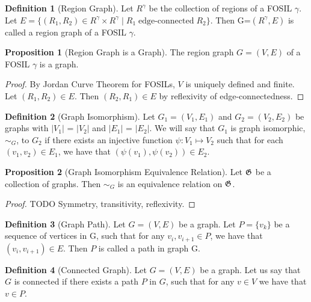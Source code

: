 \documentclass{article}
\theoremstyle{definition}
\newtheorem{definition}{Definition}
\theoremstyle{proposition}
\newtheorem{proposition}{Proposition}
\theoremstyle{theorem}
\begin{document}
\begin{definition}[Region Graph]
Let $R^{\gamma}$ be the collection of regions of a FOSIL $\gamma$. Let $E = \{(R_{1}, R_{2}) \in R^{\gamma} \times R^{\gamma} \mid R_{1} \operatorname{edge-connected} R_{2}\}$. Then G=$(R^{\gamma},E)$ is called a region graph of a FOSIL $\gamma$.
\end{definition}

\begin{proposition}[Region Graph is a Graph]
The region graph $G = (V, E)$ of a FOSIL $\gamma$ is a graph.
\end{proposition}

\begin{proof}
By Jordan Curve Theorem for FOSILs, $V$ is uniquely defined and finite. Let $(R_{1}, R_{2}) \in E$. Then $(R_{2}, R_{1}) \in E$ by reflexivity of edge-connectedness.
\end{proof}

\begin{definition}[Graph Isomorphism]
Let $G_{1}=(V_{1}, E_{1})$ and $G_{2}=(V_{2}, E_{2})$ be graphs with $\lvert V_{1} \rvert$ = $\lvert V_{2} \rvert$ and $\lvert E_{1} \rvert$ = $\lvert E_{2} \rvert$. We will say that $G_{1}$ is graph isomorphic, $\sim_{G}$, to $G_{2}$ if there exists an injective function $\psi : V_{1} \mapsto V_{2}$ such that for each $(v_{1}, v_{2}) \in E_{1}$, we have that $(\psi(v_{1}), \psi(v_{2})) \in E_{2}$.
\end{definition}

\begin{proposition}[Graph Isomorphism Equivalence Relation]
Let $\frak{G}$ be a collection of graphs. Then $\sim_{G}$ is an equivalence relation on $\frak{G}$.
\end{proposition}
\begin{proof}
TODO Symmetry, transitivity, reflexivity.
\end{proof}

\begin{definition}[Graph Path]
Let $G=(V, E)$ be a graph. Let $P=\{v_{k}\}$ be a sequence of vertices in G, such that for any $v_{i}, v_{i+1} \in P$, we have that $(v_{i}, v_{i+1}) \in E$. Then $P$ is called a path in graph G.
\end{definition}

\begin{definition}[Connected Graph]
Let $G=(V, E)$ be a graph. Let us say that $G$ is connected if there exists a path $P$ in $G$, such that for any $v \in V$ we have that $v \in P$.
\end{definition}
\end{document}
